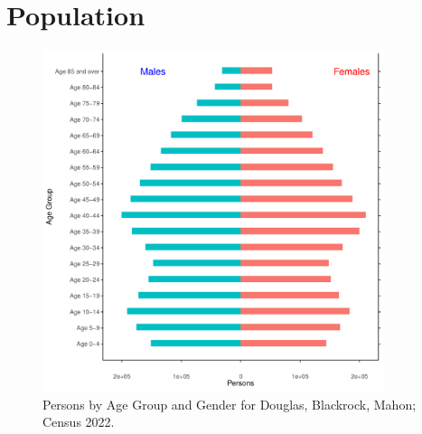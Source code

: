 \documentclass{article}
\begin{document}
\pagebreak

\section{Population} 
\label{sect:Pop}

\begin{figure}[h]
	\centering
	\includegraphics[width = 100mm]{../figures/PyramidPlot.pdf}
	\caption{Persons by Age Group and Gender for Douglas, Blackrock, Mahon; Census 2022.}
	\label{fig:2ae19629-1a6a-13a3-e055-000000000001}
	\end{figure}
\end{document}
